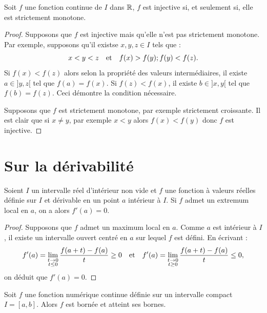 \documentclass{article}
\begin{document}
\begin{thm}
Soit $f$ une fonction continue de $I$ dans $\mathbb{R}$, $f$ est injective si, et seulement si, elle est strictement monotone.
\end{thm}

\begin{proof}
Supposons que $f$ est injective mais qu'elle n'est pas strictement monotone. Par exemple, supposons qu'il existse $x, y, z \in I$ tels que :
\[ x < y < z \quad \text{et} \quad f(x) > f(y) ; f(y) < f(z) . \]
Si $f(x) < f(z)$ alors selon la propriété des valeurs intermédiaires, il existe $a \in ]y, z[$ tel que $f(a) = f(x)$. Si $f(z) < f(x)$, 
il existe $b \in ]x, y[$ tel que $f(b) = f(z)$. Ceci démontre la condition nécessaire. \newline

Supposons que $f$ est strictement monotone, par exemple strictement croissante. Il est clair que si $x \neq y$, par exemple $x < y$ alors
$f(x) < f(y)$ donc $f$ est injective.
\end{proof}

\section{Sur la dérivabilité}

\begin{thm}
Soient $I$ un intervalle réel d'intérieur non vide et $f$ une fonction à valeurs réelles définie sur $I$ et dérivable en un point $a$ intérieur
à $I$. Si $f$ admet un extremum local en $a$, on a alors $f'(a) = 0$.
\end{thm}

\begin{proof}
Supposons que $f$ admet un maximum local en $a$. Comme $a$ est intérieur à $I$, il existe un intervalle ouvert centré en $a$ sur lequel 
$f$ est défini. En écrivant :
\[ f'(a) = \lim_{\substack{t \to 0 \\ t \leq 0}} \dfrac{f(a+t)-f(a)}{t} \geq 0 \quad \text{et} \quad 
f'(a) = \lim_{\substack{t \to 0 \\ t \geq 0}} \dfrac{f(a+t)-f(a)}{t} \leq 0 , \]
on déduit que $f'(a) = 0$. 
\end{proof}

\begin{thm}
Soit $f$ une fonction numérique continue définie sur un intervalle compact $I = [a,b]$. Alors $f$ est bornée et atteint ses bornes.
\end{thm}
\end{document}
